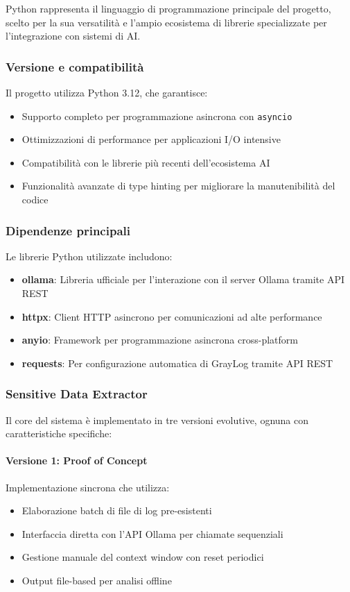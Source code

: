 \documentclass[12pt]{report}
\begin{document}
Python rappresenta il linguaggio di programmazione principale del progetto, scelto per la sua versatilità e l'ampio ecosistema di librerie specializzate per l'integrazione con sistemi di AI.

\subsubsection{Versione e compatibilità}
Il progetto utilizza Python 3.12, che garantisce:
\begin{itemize}
    \item Supporto completo per programmazione asincrona con \texttt{asyncio}
    \item Ottimizzazioni di performance per applicazioni I/O intensive
    \item Compatibilità con le librerie più recenti dell'ecosistema AI
    \item Funzionalità avanzate di type hinting per migliorare la manutenibilità del codice
\end{itemize}

\subsubsection{Dipendenze principali}
Le librerie Python utilizzate includono:

\begin{itemize}
    \item \textbf{ollama}: Libreria ufficiale per l'interazione con il server Ollama tramite API REST
    \item \textbf{httpx}: Client HTTP asincrono per comunicazioni ad alte performance
    \item \textbf{anyio}: Framework per programmazione asincrona cross-platform
    \item \textbf{requests}: Per configurazione automatica di GrayLog tramite API REST
\end{itemize}

\subsubsection{Sensitive Data Extractor}
Il core del sistema è implementato in tre versioni evolutive, ognuna con caratteristiche specifiche:

\paragraph{Versione 1: Proof of Concept}
Implementazione sincrona che utilizza:
\begin{itemize}
    \item Elaborazione batch di file di log pre-esistenti
    \item Interfaccia diretta con l'API Ollama per chiamate sequenziali
    \item Gestione manuale del context window con reset periodici
    \item Output file-based per analisi offline
\end{itemize}
\end{document}
